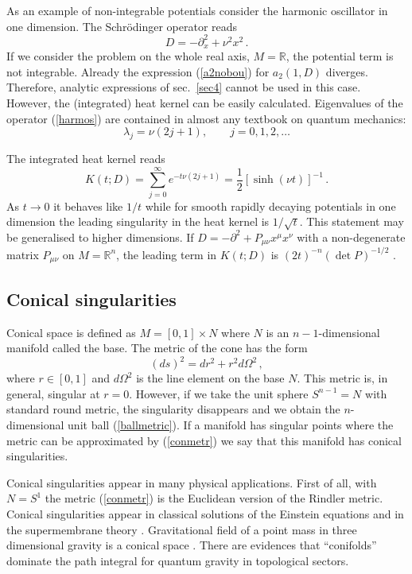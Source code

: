 As an example of non-integrable potentials consider the harmonic
oscillator in one dimension. The Schr\"{o}dinger operator reads
\begin{equation}
D=-\partial_x^2 +\nu^2 x^2 \,.\label{harmos}
\end{equation}
If we consider the problem on the whole real axis, $M=\mathbb{R}$,
the potential term is not integrable. Already the expression
(\ref{a2nobou}) for $a_2(1,D)$ diverges. Therefore, analytic expressions
of sec.\ \ref{sec4} cannot be used in this case. However, the
(integrated) heat kernel can be easily calculated. Eigenvalues of the
operator (\ref{harmos}) are contained in almost any textbook on quantum
mechanics:
\begin{equation}
\lambda_j=\nu (2j+1),\qquad j=0,1,2,\dots \label{harmspec}
\end{equation}

The integrated heat kernel reads
\begin{equation}
K(t;D)=\sum_{j=0}^\infty e^{-t\nu (2j+1)} =
\frac 12 [\sinh (\nu t)]^{-1} \,.\label{harmheat}
\end{equation}
As $t\to 0$ it behaves like $1/t$ while for smooth rapidly decaying
potentials in one dimension the leading singularity in the heat kernel
is $1/\sqrt{t}$. This statement may be generalised to higher dimensions.
If $D=-\partial^2 +P_{\mu\nu}x^\mu x^\nu$ with a non-degenerate 
matrix $P_{\mu\nu}$ on $M=\mathbb{R}^n$, the leading
term in $K(t;D)$ is $(2t)^{-n} (\det P)^{-1/2}$ \cite{Avramidi:1995ik}.

\subsection{Conical singularities}\label{s6consin}
Conical space is defined as $M=[0,1]\times N$ where $N$ is an
$n-1$-dimensional manifold called the base. The metric of the
cone has the form
\begin{equation}
(ds)^2=dr^2 +r^2 d\Omega^2 \,,\label{conmetr}
\end{equation}
where $r\in [0,1]$ and $d\Omega^2$ is the line element on the
base $N$. This metric is, in general, singular at $r=0$. However, if we 
take the unit sphere $S^{n-1}=N$ with standard round metric,
the singularity disappears and we obtain the $n$-dimensional unit ball
(\ref{ballmetric}). If a manifold has singular points where
the metric can be approximated by (\ref{conmetr}) we say that this
manifold has conical singularities. 

Conical singularities appear in many physical applications.
First of all, with $N=S^1$ the metric (\ref{conmetr}) is the Euclidean
version of the Rindler metric. Conical singularities appear in
classical solutions of the Einstein equations 
\cite{Sokolov:1977,Frolov:1987dz,Barriola:1989hx}
and in the supermembrane theory 
\cite{Vassilevich:1991vy}. Gravitational field of a point mass in 
three dimensional gravity is a conical space 
\cite{Deser:1984tn,Deser:1988qn}. There are evidences \cite{Schleich:1993bs}
that ``conifolds'' dominate the path integral for quantum gravity in
topological sectors.

